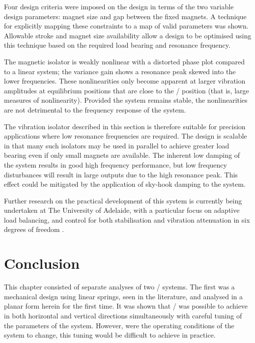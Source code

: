 \documentclass[11pt,a4paper]{memoir}
\begin{document}
Four design criteria were imposed on the design in terms of the two variable design
parameters: magnet size and gap between the fixed magnets. A technique for explicitly
mapping these constraints to a map of valid parameters was shown. Allowable stroke
and magnet size availability allow a design to be optimised using this technique
based on the required load bearing and resonance frequency.

The magnetic isolator is weakly nonlinear with a distorted phase plot compared to
a linear system; the variance gain shows a resonance peak skewed into the lower
frequencies. These nonlinearities only become apparent at larger vibration amplitudes
at equilibrium positions that are close to the \qzs/ position
(that is, large measures of nonlinearity). Provided the system remains stable,
the nonlinearities are not detrimental to the frequency response of the system.

The vibration isolator described in this section is therefore suitable for
precision applications where low resonance frequencies are required. The
design is scalable in that many such isolators may be used in parallel to
achieve greater load bearing even if only small magnets are available. The
inherent low damping of the system results in good high frequency performance,
but low frequency disturbances will result in large outputs due to the high
resonance peak. This effect could be mitigated by the application of sky-hook
damping to the system.

Further research on the practical development of this system is currently being undertaken at The University of Adelaide, with a particular focus on adaptive load balancing, and control for both stabilisation and vibration attenuation in six degrees of freedom \cite{zhu2011-icmt}.

\section{Conclusion}

This chapter consisted of separate analyses of two \qzs/ systems.
The first was a mechanical design using linear springs, seen in the literature, and analysed in a planar form herein for the first time.
It was shown that \qzs/ was possible to achieve in both horizontal and vertical directions simultaneously with careful tuning of the parameters of the system.
However, were the operating conditions of the system to change, this tuning would be difficult to achieve in practice.
\end{document}
